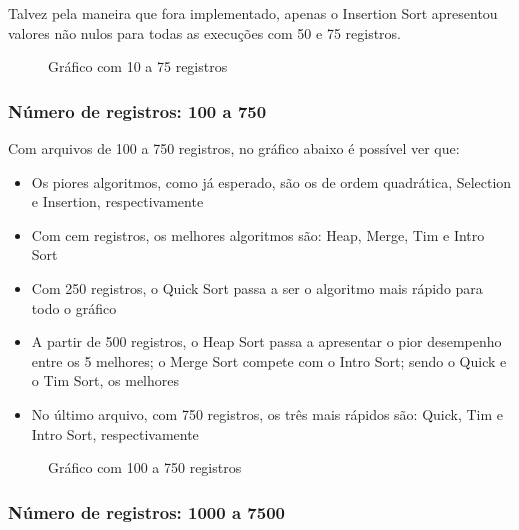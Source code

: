 \documentclass[a4paper,12pt]{scrartcl}
\begin{document}
Talvez pela maneira que fora implementado, apenas o Insertion Sort apresentou valores não nulos para todas as execuções com 50 e 75 registros.

\begin{figure}[H]
    \centering
    
    \caption{Gráfico com 10 a 75 registros}
    \label{mapaSelect}
\end{figure}

\subsubsection{Número de registros: 100 a 750}

Com arquivos de 100 a 750 registros, no gráfico abaixo é possível ver que:

\begin{itemize}
    \item
    Os piores algoritmos, como já esperado, são os de ordem quadrática, Selection e Insertion, respectivamente
    
    \item
    Com cem registros, os melhores algoritmos são: Heap, Merge, Tim e Intro Sort
    
    \item
    Com 250 registros, o Quick Sort passa a ser o algoritmo mais rápido para todo o gráfico
    
    \item
    A partir de 500 registros, o Heap Sort passa a apresentar o pior desempenho entre os 5 melhores; o Merge Sort compete com o Intro Sort; sendo o Quick e o Tim Sort, os melhores
    
    \item
    No último arquivo, com 750 registros, os três mais rápidos são: Quick, Tim e Intro Sort, respectivamente
    
\end{itemize}

\begin{figure}[H]
    \centering
    
    \caption{Gráfico com 100 a 750 registros}
    \label{mapaSelect}
\end{figure}

\subsubsection{Número de registros: 1000 a 7500}
\end{document}
